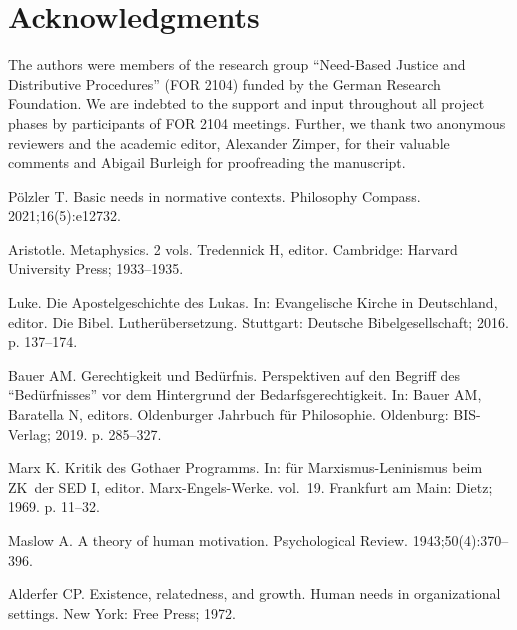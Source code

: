 \documentclass[10pt,letterpaper]{article}
\begin{document}
\clearpage
\section*{Acknowledgments}
The authors were members of the research group ``Need-Based Justice and Distributive Procedures'' (FOR 2104) funded by the German Research Foundation.
We are indebted to the support and input throughout all project phases by participants of FOR 2104 meetings.
Further, we thank two anonymous reviewers and the academic editor, Alexander Zimper, for their valuable comments and Abigail Burleigh for proofreading the manuscript.


\nolinenumbers
\clearpage
\begin{thebibliography}{100}

Pölzler T.
\newblock Basic needs in normative contexts.
\newblock Philosophy Compass. 2021;16(5):e12732.

Aristotle.
\newblock Metaphysics. 2 vols.
\newblock Tredennick H, editor. Cambridge: Harvard University Press;
  1933--1935.

Luke.
\newblock Die {Apostelgeschichte} des {Lukas}.
\newblock In: {Evangelische Kirche in Deutschland}, editor. Die {Bibel}.
  {Lutherübersetzung}. Stuttgart: Deutsche Bibelgesellschaft; 2016. p.
  137--174.

Bauer AM.
\newblock Gerechtigkeit und {Bedürfnis}. {Perspektiven} auf den {Begriff} des
  ``{Bedürfnisses}'' vor dem {Hintergrund} der {Bedarfsgerechtigkeit}.
\newblock In: Bauer AM, Baratella N, editors. Oldenburger {Jahrbuch} für
  {Philosophie}. Oldenburg: BIS-Verlag; 2019. p. 285--327.

Marx K.
\newblock Kritik des {Gothaer} {Programms}.
\newblock In: für Marxismus-Leninismus beim ZK~der SED I, editor.
  Marx-{Engels}-{Werke}. vol.~19. Frankfurt am Main: Dietz; 1969. p. 11--32.

Maslow A.
\newblock A theory of human motivation.
\newblock Psychological Review. 1943;50(4):370--396.

Alderfer CP.
\newblock Existence, relatedness, and growth. {Human} needs in organizational
  settings.
\newblock New York: Free Press; 1972.


\end{thebibliography}
\end{document}
